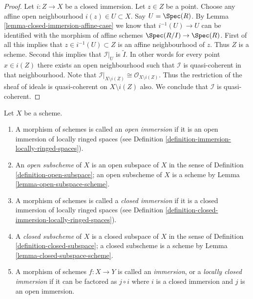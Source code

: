 \begin{proof}
Let $i : Z \to X$ be a closed immersion.
Let $z \in Z$ be a point. Choose any affine open
neighbourhood $i(z) \in U \subset X$. Say $U = \Spec(R)$.
By Lemma \ref{lemma-closed-immersion-affine-case} we know
that $i^{-1}(U) \to U$ can be identified with the morphism
of affine schemes $\Spec(R/I) \to \Spec(R)$.
First of all this implies that $z \in i^{-1}(U) \subset Z$ is an
affine neighbourhood of $z$. Thus $Z$ is a scheme. Second
this implies that $\mathcal{I}|_U$ is $\widetilde I$.
In other words for every point $x \in i(Z)$ there exists an
open neighbourhood such that $\mathcal{I}$ is quasi-coherent in
that neighbourhood. Note that $\mathcal{I}|_{X \setminus i(Z)}
\cong \mathcal{O}_{X \setminus i(Z)}$. Thus the restriction
of the sheaf of ideals is quasi-coherent on $X \setminus i(Z)$
also. We conclude that $\mathcal{I}$ is quasi-coherent.
\end{proof}

\begin{definition}
\label{definition-immersion}
\begin{reference}
\cite[Chapter II, \S 1, no. 31, p. 224]{FAC}
\end{reference}
Let $X$ be a scheme.
\begin{enumerate}
\item A morphism of schemes is called an {\it open immersion}
if it is an open immersion of locally ringed spaces (see
Definition \ref{definition-immersion-locally-ringed-spaces}).
\item An {\it open subscheme} of $X$ is an open subspace of $X$
in the sense of Definition \ref{definition-open-subspace}; an open subscheme
of $X$ is a scheme by Lemma \ref{lemma-open-subspace-scheme}.
\item A morphism of schemes is called a {\it closed immersion}
if it is a closed immersion of locally ringed spaces (see
Definition \ref{definition-closed-immersion-locally-ringed-spaces}).
\item A {\it closed subscheme} of $X$ is a closed subspace of $X$
in the sense of Definition \ref{definition-closed-subspace}; a closed subscheme
is a scheme by Lemma \ref{lemma-closed-subspace-scheme}.
\item A morphism of schemes $f : X \to Y$ is called an {\it immersion},
or a {\it locally closed immersion} if it can be factored as
$j \circ i$ where $i$ is a closed immersion and $j$ is an open
immersion.
\end{enumerate}
\end{definition}

